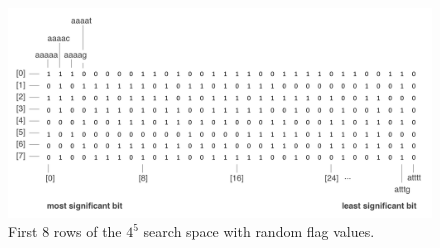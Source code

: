 \begin{figure}[h]
	\centering
	\label{fig:search_space}
	\includegraphics[width=5in]{contents/00_images/search_space}\vspace*{5pt}
	\caption{First 8 rows of the $4^{5}$ search space with random flag values.}
\end{figure}